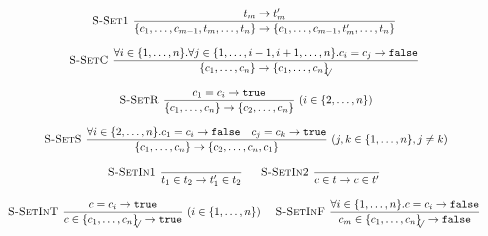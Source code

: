 \documentclass[a4paper]{article}
\newcommand{\s}[1]{\mathtt{#1}}
\newcommand{\sLb}{\s{\{}}
\newcommand{\sRb}{\s{\}}}
\newcommand{\strue}{\s{true}}
\newcommand{\sfalse}{\s{false}}
\newcommand{\sset}[1]{\sLb #1 \sRb}
\newcommand{\ssetc}[1]{\sset{#1}_{\!\!\!\surd}}
\newcommand{\step}{\to}
\newcommand{\dotset}[2]{\{#1,\ldots,#2\}}
\renewcommand{\rule}[3][]{\ \mbox{\textsc{#1 }}\dfrac{#2}{#3}\ }
\begin{document}
\[\begin{array}{c}
\rule[S-Set1]{t_m \step t'_m}{\{c_1,\ldots,c_{m-1},t_m,\ldots,t_n\} \step \{c_1,\ldots,c_{m-1},t'_m,\ldots,t_n\} }
\quad\\\\
\rule[S-SetC]{\forall i \in \dotset{1}{n}.\forall j \in \dotset{1}{i-1,i+1,\ldots,n}. c_i = c_j \step \sfalse}
{\sset{c_1,\ldots,c_n} \step \ssetc{c_1,\ldots,c_n}}
\quad\\\\
\rule[S-SetR]{c_1 = c_i \step \strue}
{\sset{c_1,\ldots,c_n} \step \sset{c_2,\ldots,c_n}}(i \in \dotset{2}{n})
\quad\\\\
\rule[S-SetS]{\forall i \in \dotset{2}{n}. c_1 = c_i \step \sfalse
\quad c_j = c_k \step \strue}
{\sset{c_1,\ldots,c_n} \step \sset{c_2,\ldots,c_n,c_1}}(j,k \in \dotset{1}{n}, j\neq k)
\quad\\\\
\rule[S-SetIn1]{}{t_1\in t_2 \step t_1'\in t_2}
\quad
\rule[S-SetIn2]{}{c\in t \step c\in t'}
\quad\\\\
\rule[S-SetInT]{c=c_i \step \strue}{c\in \ssetc{c_1,\ldots,c_n} \step \strue}(i \in \dotset{1}{n})
\quad
\rule[S-SetInF]{\forall i\in\{1,\ldots,n\}. c=c_i \step \sfalse}{c_m \in \ssetc{c_1,\ldots,c_n} \step \sfalse}
\quad
\end{array}\]
\end{document}

